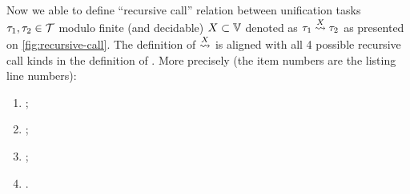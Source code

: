 Now we able to define ``recursive call'' relation between unification tasks $\tau_1, \tau_2 \in \mathcal{T}$ modulo finite (and decidable) $X \subset \mathbb{V}$ denoted as $\tau_1 \mathrel{\overset{X}{\rightsquigarrow}} \tau_2$ as presented on \autoref{fig:recursive-call}. The definition of $\mathrel{\overset{X}{\rightsquigarrow}}$ is aligned with all 4 possible recursive call kinds in the definition of \unify. More precisely (the item numbers are the listing line numbers):
\begin{enumerate}
    \item {};
    \item {};
    \item {};
    \item {}.
\end{enumerate}


